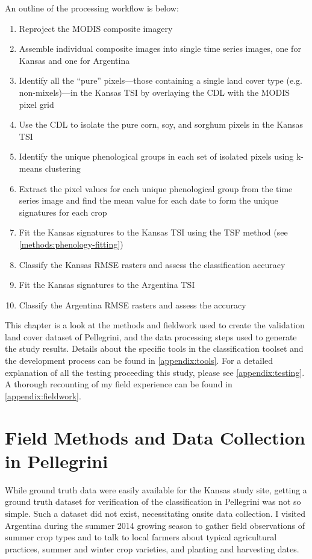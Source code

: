 An outline of the processing workflow is below:

\begin{Spacing}{1.2}
\begin{enumerate}
  \item Reproject the MODIS composite imagery
  \item Assemble individual composite images into single time series images, one for Kansas and one for Argentina
  \item Identify all the ``pure'' pixels---those containing a single land cover type (e.g. non-mixels)---in the Kansas TSI by overlaying the CDL with the MODIS pixel grid
  \item Use the CDL to isolate the pure corn, soy, and sorghum pixels in the Kansas TSI
  \item Identify the unique phenological groups in each set of isolated pixels using k-means clustering
  \item Extract the pixel values for each unique phenological group from the time series image and find the mean value for each date to form the unique signatures for each crop
  \item Fit the Kansas signatures to the Kansas TSI using the TSF method (see \autoref{methods:phenology-fitting})
  \item Classify the Kansas RMSE rasters and assess the classification accuracy
  \item Fit the Kansas signatures to the Argentina TSI
  \item Classify the Argentina RMSE rasters and assess the accuracy
\end{enumerate}
\end{Spacing}

This chapter is a look at the methods and fieldwork used to create the validation land cover dataset of Pellegrini, and the data processing steps used to generate the study results. Details about the specific tools in the classification toolset and the development process can be found in \autoref{appendix:tools}. For a detailed explanation of all the testing proceeding this study, please see \autoref{appendix:testing}. A thorough recounting of my field experience can be found in \autoref{appendix:fieldwork}.


\section{Field Methods and Data Collection in Pellegrini}

While ground truth data were easily available for the Kansas study site, getting a ground truth dataset for verification of the classification in Pellegrini was not so simple. Such a dataset did not exist, necessitating onsite data collection. I visited Argentina during the summer 2014 growing season to gather field observations of summer crop types and to talk to local farmers about typical agricultural practices, summer and winter crop varieties, and planting and harvesting dates.

